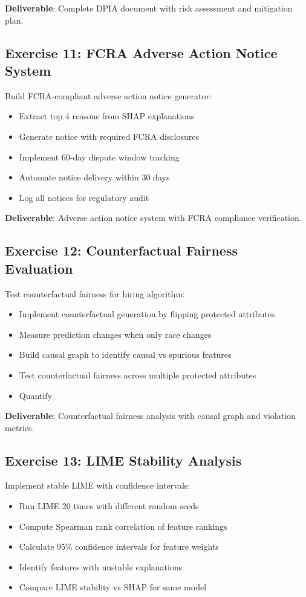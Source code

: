 \textbf{Deliverable}: Complete DPIA document with risk assessment and mitigation plan.

\subsection{Exercise 11: FCRA Adverse Action Notice System}

Build FCRA-compliant adverse action notice generator:
\begin{itemize}
    \item Extract top 4 reasons from SHAP explanations
    \item Generate notice with required FCRA disclosures
    \item Implement 60-day dispute window tracking
    \item Automate notice delivery within 30 days
    \item Log all notices for regulatory audit
\end{itemize}

\textbf{Deliverable}: Adverse action notice system with FCRA compliance verification.

\subsection{Exercise 12: Counterfactual Fairness Evaluation}

Test counterfactual fairness for hiring algorithm:
\begin{itemize}
    \item Implement counterfactual generation by flipping protected attributes
    \item Measure prediction changes when only race changes
    \item Build causal graph to identify causal vs spurious features
    \item Test counterfactual fairness across multiple protected attributes
    \item Quantify %
\end{itemize}

\textbf{Deliverable}: Counterfactual fairness analysis with causal graph and violation metrics.

\subsection{Exercise 13: LIME Stability Analysis}

Implement stable LIME with confidence intervals:
\begin{itemize}
    \item Run LIME 20 times with different random seeds
    \item Compute Spearman rank correlation of feature rankings
    \item Calculate 95\% confidence intervals for feature weights
    \item Identify features with unstable explanations
    \item Compare LIME stability vs SHAP for same model
\end{itemize}

